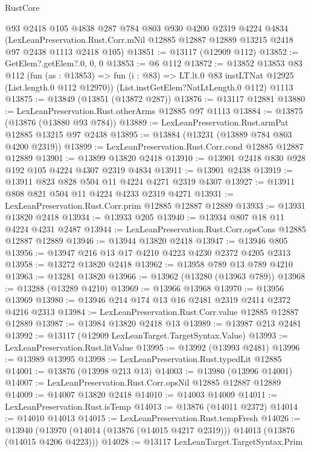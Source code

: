 \begin{lexlean}{RustCore}
\begin{coremodule}
    @93
    @2418
    @105
    @4838
    @287
    @784
    @803
    @930
    @4200
    @2319
    @4224
    @4834
    (LexLeanPreservation.Rust.Corr.mNil
      @12885
      @12887
      @12889
      @13215
      @2418
      @97
      @2438
      @1113
      @2418
      @105)
@13851 := @13117 (@12909 @112)
@13852 := GetElem?.getElem?.{0, 0, 0}
@13853 := @6 @112
@13872 := @13852
    @13853
    @83
    @112
    (fun (as : @13853) =>
    fun (i : @83) => LT.lt.{0} @83 instLTNat @12925 (List.length.{0} @112 @12970))
    (List.instGetElem?NatLtLength.{0} @112)
    @1113
@13875 := @13849 (@13851 (@13872 @287))
@13876 := @13117 @12881
@13880 := LexLeanPreservation.Rust.otherArms @12885 @97 @1113
@13884 := @13875 (@13876 (@13880 @93 @784))
@13889 := LexLeanPreservation.Rust.armPat @12885 @13215 @97 @2438
@13895 := @13884 (@13231 (@13889 @784 @803 @4200 @2319))
@13899 := LexLeanPreservation.Rust.Corr.cond @12885 @12887 @12889
@13901 := @13899 @13820 @2418
@13910 := @13901 @2418 @830 @928 @192 @105 @4224 @4307 @2319 @4834
@13911 := @13901 @2438
@13919 := @13911 @823 @828 @504 @11 @4224 @4271 @2319 @4307
@13927 := @13911 @808 @821 @504 @11 @4224 @4233 @2319 @4271
@13931 := LexLeanPreservation.Rust.Corr.prim @12885 @12887 @12889
@13933 := @13931 @13820 @2418
@13934 := @13933 @205
@13940 := @13934 @807 @18 @11 @4224 @4231 @2487
@13944 := LexLeanPreservation.Rust.Corr.opsCons @12885 @12887 @12889
@13946 := @13944 @13820 @2418
@13947 := @13946 @805
@13956 := @13947 @216 @13 @17 @4210 @4223 @4230 @2372 @4205 @2313
@13958 := @13272 @13820 @2418
@13962 := @13958 @789 @13 @789 @4210
@13963 := @13281 @13820
@13966 := @13962 (@13280 (@13963 @789))
@13968 := @13288 (@13289 @4210)
@13969 := @13966 @13968
@13970 := @13956 @13969
@13980 := @13946 @214 @174 @13 @16 @2481 @2319 @2414 @2372 @4216 @2313
@13984 := LexLeanPreservation.Rust.Corr.value @12885 @12887 @12889
@13987 := @13984 @13820 @2418 @13
@13989 := @13987 @213 @2481
@13992 := @13117 (@12909 LexLeanTarget.TargetSyntax.Value)
@13993 := LexLeanPreservation.Rust.litValue
@13995 := @13992 (@13993 @2481)
@13996 := @13989 @13995
@13998 := LexLeanPreservation.Rust.typedLit @12885
@14001 := @13876 (@13998 @213 @13)
@14003 := @13980 (@13996 @14001)
@14007 := LexLeanPreservation.Rust.Corr.opsNil @12885 @12887 @12889
@14009 := @14007 @13820 @2418
@14010 := @14003 @14009
@14011 := LexLeanPreservation.Rust.isTemp
@14013 := @13876 (@14011 @2372)
@14014 := @14010 @14013
@14015 := LexLeanPreservation.Rust.tempFresh
@14026 := @13940
    (@13970 (@14014 (@13876 (@14015 @4217 @2319))) @14013 (@13876 (@14015 @4206 @4223)))
@14028 := @13117 LexLeanTarget.TargetSyntax.Prim

\end{coremodule}
\end{lexlean}
